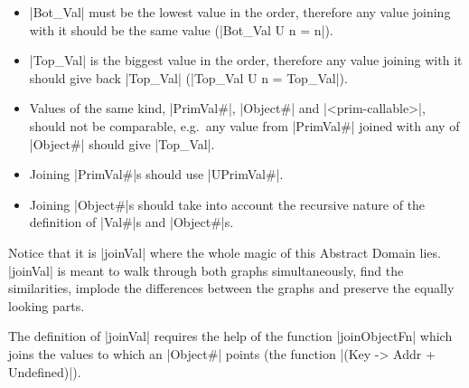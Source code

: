 \begin{itemize}
\tightlist
\item
  \pycode|Bot_Val| must be the lowest value in the order, therefore any
  value joining with it should be the same value
  (\pycode|Bot_Val U n = n|).
\item
  \pycode|Top_Val| is the biggest value in the order, therefore any
  value joining with it should give back \pycode|Top_Val|
  (\pycode|Top_Val U n = Top_Val|).
\item
  Values of the same kind, \pycode|PrimVal#|, \pycode|Object#| and
  \pycode|<prim-callable>|, should not be
  comparable, e.g.~any value from \pycode|PrimVal#| joined with any of
  \pycode|Object#| should give \pycode|Top_Val|.
\item
  Joining \pycode|PrimVal#|s should use \pycode|UPrimVal#|.
\item
  Joining \pycode|Object#|s should take into account the recursive
  nature of the definition of \pycode|Val#|s and \pycode|Object#|s.
\end{itemize}

Notice that it is \pycode|joinVal| where the whole magic of this Abstract
Domain lies. \pycode|joinVal| is meant to walk through both graphs
simultaneously, find the similarities, implode the differences between
the graphs and preserve the equally looking parts.

The definition of \pycode|joinVal| requires the help of the function
\pycode|joinObjectFn| which joins the values to which an
\pycode|Object#| points (the function
\pycode|(Key -> Addr + Undefined)|).

